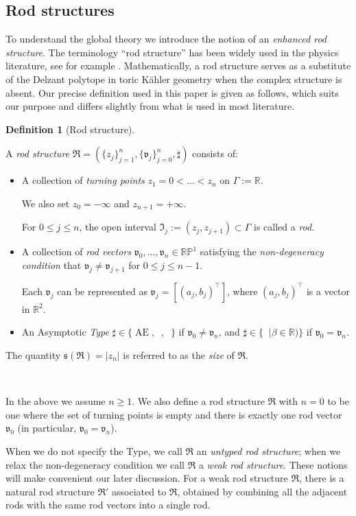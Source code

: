 \documentclass[a4paper,11pt]{amsart}
\theoremstyle{definition}
\newtheorem{definition}[theorem]{Definition}
\numberwithin{equation}{section}
\newcommand{\R}{\mathbb{R}}
\newcommand{\mv} {\mathfrak v}
\newcommand{\mR} {\mathfrak R}
\DeclareMathOperator{\Ae}{AE}
\DeclareMathOperator{\ALFp}{ALF^+}
\DeclareMathOperator{\ALFm}{ALF^{--}}
\DeclareMathOperator{\AFa}{AF_\beta}
\begin{document}
 \subsection{Rod structures} \label{ss:defintion of rod structures} To understand the global theory  we introduce the notion of an \emph{enhanced rod structure}. The terminology ``rod structure'' has been widely used in the physics literature, see for example \cite{OrlikRaymond, Harmark, Hollands, ChenTeo2, Kunduri}. Mathematically, a rod structure serves as a substitute  of the Delzant polytope in toric K\"ahler geometry when the complex structure is absent. Our precise definition used in this paper is given as follows, which suits our purpose  and differs slightly from what is used in most literature.
\begin{definition}[Rod structure]\label{def:rod structures}
	

A \emph{rod structure} \( \mathfrak{R} = (\{z_j\}_{j=1}^{n}, \{\mathfrak{v}_j\}_{j=0}^{n}, \sharp) \) consists of:  
\begin{itemize}
    \item A collection of \emph{turning points} \( z_1 = 0 < \dots < z_n \) on \( \Gamma := \mathbb{R} \).
    
    We also set \( z_0 = -\infty \) and \( z_{n+1} = +\infty \). 
    
    For \( 0 \leq j \leq n \), the open interval \( \mathfrak{I}_j := (z_j, z_{j+1}) \subset \Gamma \) is called a \emph{rod}.
    \item A collection of \emph{rod vectors} \( \mathfrak{v}_0, \dots, \mathfrak{v}_n \in \mathbb{RP}^1 \) satisfying the \emph{non-degeneracy condition} that \( \mathfrak{v}_j \neq \mathfrak{v}_{j+1} \) for \( 0 \leq j \leq n-1 \).
    
    Each \( \mathfrak{v}_j \) can be represented as \( \mathfrak{v}_j = [(a_j, b_j)^{\top}] \), where \( (a_j, b_j)^{\top} \) is a  vector in \( \mathbb{R}^2 \).
    \item An Asymptotic \emph{Type} $\sharp\in \{\Ae, \ALFp, \ALFm\}$ if $\mv_0\neq\mv_n$, and $\sharp \in \{\AFa|\beta\in \R)\}$ if $\mv_0=\mv_n$. 
\end{itemize}

The quantity \( \mathfrak{s}(\mathfrak{R}) = |z_n| \) is referred to as the \emph{size} of $\mR$. 

\

In the above we assume $n\geq 1 $. We also define a rod structure $\mR$ with $n=0$ to be one where the set of turning points is empty and there is exactly one rod vector $\mv_0$ (in particular, $\mv_0=\mv_n$).



When we do not specify the Type, we call $\mR$ an \emph{untyped rod structure}; when we relax the non-degeneracy condition we call $\mR$ a \emph{weak rod structure}. These notions will make convenient our later discussion. For a weak rod structure $\mR$, there is a natural rod structure $\mR'$ associated to $\mR$, obtained by combining all the adjacent rods with the same rod vectors into a single rod. 

 \end{definition} 
\end{document}
